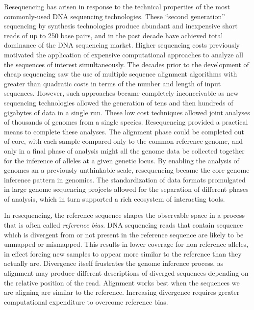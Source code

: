 Resequencing has arisen in response to the technical properties of the most commonly-used DNA sequencing technologies.
These ``second generation'' sequencing by synthesis technologies produce abundant and inexpensive short reads of up to 250 base pairs, and in the past decade have achieved total dominance of the DNA sequencing market.
Higher sequencing costs previously motivated the application of expensive computational approaches to analyze all the sequences of interest simultaneously.
The decades prior to the development of cheap sequencing saw the use of multiple sequence alignment algorithms with greater than quadratic costs in terms of the number and length of input sequences.
However, such approaches became completely inconceivable as new sequencing technologies allowed the generation of tens and then hundreds of gigabytes of data in a single run.
These low cost techniques allowed joint analyses of thousands of genomes from a single species.
Resequencing provided a practical means to complete these analyses.
The alignment phase could be completed out of core, with each sample compared only to the common reference genome, and only in a final phase of analysis might all the genome data be collected together for the inference of alleles at a given genetic locus.
By enabling the analysis of genomes an a previously unthinkable scale, resequencing became the core genome inference pattern in genomics.
The standardization of data formats promulgated in large genome sequencing projects allowed for the separation of different phases of analysis, which in turn supported a rich ecosystem of interacting tools.

In resequencing, the reference sequence shapes the observable space in a process that is often called \emph{reference bias}.
DNA sequencing reads that contain sequence which is divergent from or not present in the reference sequence are likely to be unmapped or mismapped.
This results in lower coverage for non-reference alleles, in effect forcing new samples to appear more similar to the reference than they actually are.
Divergence itself frustrates the genome inference process, as alignment may produce different descriptions of diverged sequences depending on the relative position of the read.
Alignment works best when the sequences we are aligning are similar to the reference.
Increasing divergence requires greater computational expenditure to overcome reference bias.

